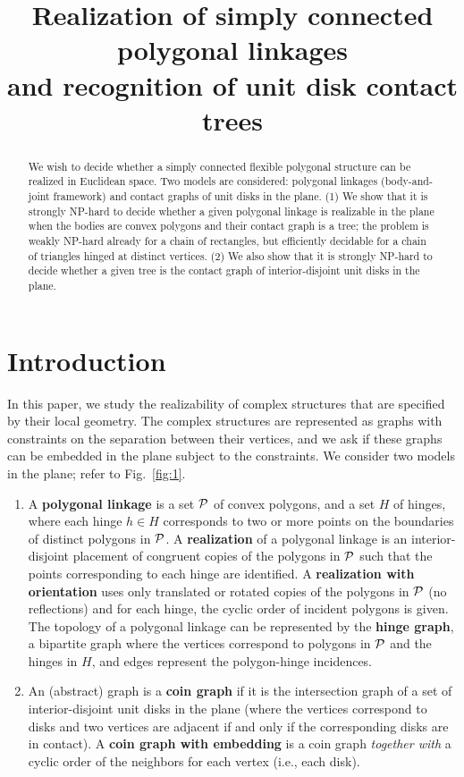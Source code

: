 \documentclass{article}
\title{Realization of simply connected polygonal linkages\\ and recognition of unit disk contact trees}
\theoremstyle{plain}%
\newcommand{\PP}{{\cal P}} %
\begin{document}
\maketitle
\pagestyle{empty}
 
\begin{abstract}
We wish to decide whether a simply connected flexible polygonal structure can be realized in Euclidean space. Two models are considered: polygonal linkages (body-and-joint framework) and contact graphs of unit disks in the plane. (1) We show that it is strongly NP-hard to decide whether a given polygonal linkage is realizable in the plane when the bodies are convex polygons and their contact graph is a tree; the problem is weakly NP-hard already for a chain of rectangles, but efficiently decidable for a chain of triangles hinged at distinct vertices. (2) We also show that it is strongly NP-hard to decide whether a given tree is the contact graph of interior-disjoint unit disks in the plane.
\end{abstract}

\section{Introduction}\label{sec:intro}

In this paper, we study the realizability of complex structures that are specified by their local geometry.
The complex structures are represented as graphs with constraints on the separation between their vertices, and we ask if these graphs can be embedded in the plane subject to the constraints.
We consider two models in the plane; refer to Fig.~\ref{fig:1}.

\begin{enumerate}
\item A \textbf{polygonal linkage} is a set $\PP$ of convex polygons, and a set $H$ of hinges, where each hinge $h\in H$ corresponds to two or more points on the boundaries of distinct polygons in $\PP$. A \textbf{realization} of a polygonal linkage is an interior-disjoint placement of congruent copies of the polygons in $\PP$ such that the points corresponding to each hinge are identified. A \textbf{realization with orientation} uses only translated or rotated copies of the polygons in $\PP$ (no reflections) and for each hinge, the cyclic order of incident polygons is given. The topology of a polygonal linkage can be represented by the \textbf{hinge graph}, a bipartite graph where the vertices correspond to polygons in $\PP$ and the hinges in $H$, and edges represent the polygon-hinge incidences.
\item An (abstract) graph is a \textbf{coin graph} if it is the intersection graph of a set of interior-disjoint unit disks in the plane (where the vertices correspond to disks and two vertices are adjacent if and only if the corresponding disks are in contact). A \textbf{coin graph with embedding} is a coin graph \emph{together with} a cyclic order of the neighbors for each vertex (i.e., each disk).
\end{enumerate}
\end{document}
